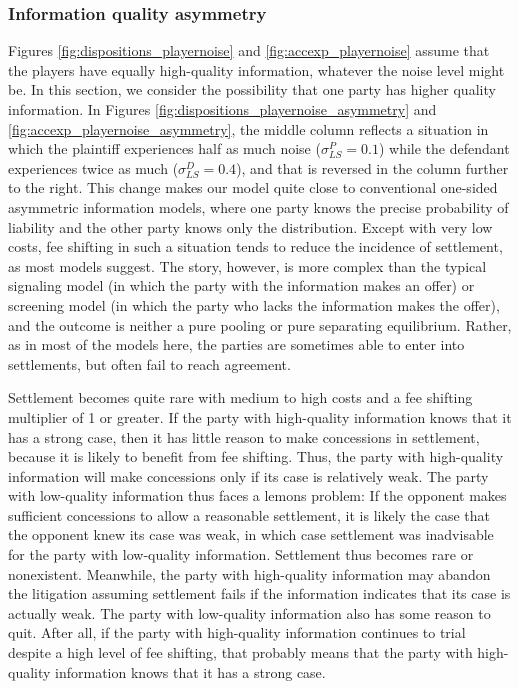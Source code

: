 \documentclass{article}
\begin{document}
\subsubsection{Information quality asymmetry}

Figures \ref{fig:dispositions_playernoise} and \ref{fig:accexp_playernoise} assume that the players have equally high-quality information, whatever the noise level might be. In this section, we consider the possibility that one party has higher quality information. In Figures \ref{fig:dispositions_playernoise_asymmetry} and \ref{fig:accexp_playernoise_asymmetry}, the middle column reflects a situation in which the plaintiff experiences half as much noise ($\sigma_{LS}^P=0.1$) while the defendant experiences twice as much ($\sigma_{LS}^D=0.4$), and that is reversed in the column further to the right. This change makes our model quite close to conventional one-sided asymmetric information models, where one party knows the precise probability of liability and the other party knows only the distribution. Except with very low costs, fee shifting in such a situation tends to reduce the incidence of settlement, as most models suggest. The story, however, is more complex than the typical signaling model (in which the party with the information makes an offer) or screening model (in which the party who lacks the information makes the offer), and the outcome is neither a pure pooling or pure separating equilibrium. Rather, as in most of the models here, the parties are sometimes able to enter into settlements, but often fail to reach agreement. 

Settlement becomes quite rare with medium to high costs and a fee shifting multiplier of 1 or greater. If the party with high-quality information knows that it has a strong case, then it has little reason to make concessions in settlement, because it is likely to benefit from fee shifting. Thus, the party with high-quality information will make concessions only if its case is relatively weak. The party with low-quality information thus faces a lemons problem: If the opponent makes sufficient concessions to allow a reasonable settlement, it is likely the case that the opponent knew its case was weak, in which case settlement was inadvisable for the party with low-quality information. Settlement thus becomes rare or nonexistent. Meanwhile, the party with high-quality information may abandon the litigation assuming settlement fails if the information indicates that its case is actually weak. The party with low-quality information also has some reason to quit. After all, if the party with high-quality information continues to trial despite a high level of fee shifting, that probably means that the party with high-quality information knows that it has a strong case. 
\end{document}
